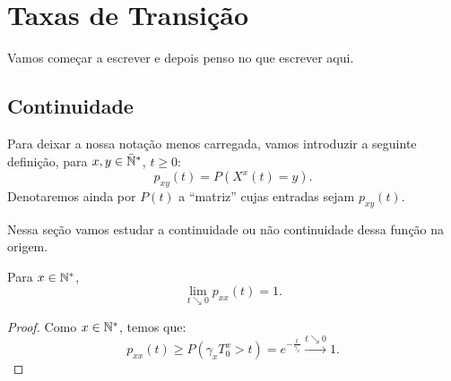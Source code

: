 \chapter{Taxas de Transição}
\label{cap:taxas}

Vamos começar a escrever e depois penso no que escrever aqui.


\section{Continuidade}
\label{sec:continuidade}

Para deixar a nossa notação menos carregada, vamos introduzir a
seguinte definição, para $x, y \in {\mathbb{\bar{N}^*}}$, $t \geq 0$:
\begin{equation}
  p_{xy} (t) = P(X^x(t) = y).
\end{equation}
Denotaremos ainda por $P(t)$ a ``matriz'' cujas entradas sejam $p_{xy}(t)$.

Nessa seção vamos estudar a continuidade ou não continuidade dessa
função na origem.

\begin{proposicao}
  Para $x \in {\mathbb{N^*}}$,
  \begin{equation}
    \lim_{t \searrow 0}p_{xx}(t) = 1.   
  \end{equation}
\end{proposicao}
\begin{proof}
  Como $x \in {\mathbb{N^*}}$, temos que:
  \begin{displaymath}
    p_{xx}(t) \geq P( \gamma_x T^x_0 > t) = e^{-\frac{t}{\gamma_x}}
    \xrightarrow{t \searrow 0} 1.
  \end{displaymath}
\end{proof}

